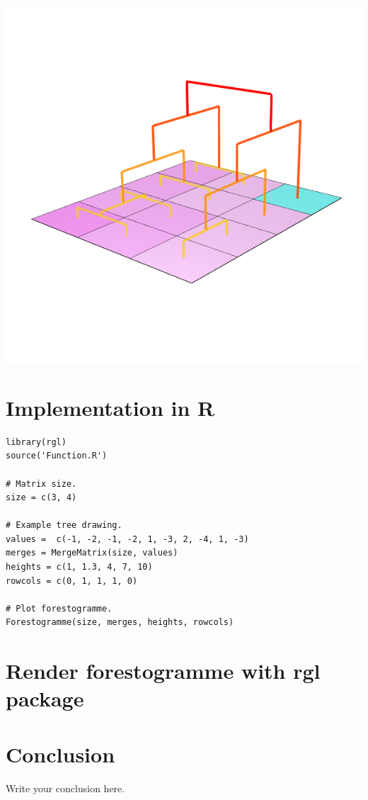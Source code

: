\documentclass{article}
\begin{document}
\centering \includegraphics[scale=0.3]{Merge5}

\raggedright


\section{Implementation in R}

\begin{lstlisting}[]
library(rgl)
source('Function.R')

# Matrix size.
size = c(3, 4)

# Example tree drawing.
values =  c(-1, -2, -1, -2, 1, -3, 2, -4, 1, -3)
merges = MergeMatrix(size, values)
heights = c(1, 1.3, 4, 7, 10)
rowcols = c(0, 1, 1, 1, 0)

# Plot forestogramme.
Forestogramme(size, merges, heights, rowcols)
\end{lstlisting}
\section{Render forestogramme with rgl package}

\section{Conclusion}
Write your conclusion here.
\end{document}
